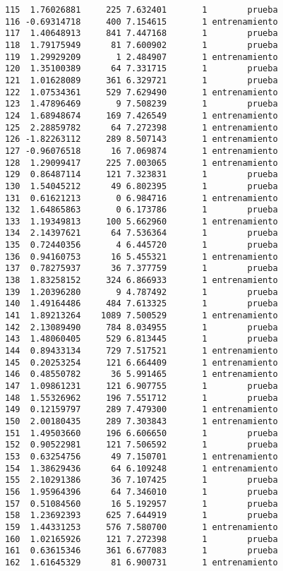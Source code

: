 \documentclass[
  letterpaper,
  DIV=11,
  numbers=noendperiod]{scrreprt}
\begin{document}
\begin{verbatim}
115  1.76026881     225 7.632401       1        prueba
116 -0.69314718     400 7.154615       1 entrenamiento
117  1.40648913     841 7.447168       1        prueba
118  1.79175949      81 7.600902       1        prueba
119  1.29929209       1 2.484907       1 entrenamiento
120  1.35100389      64 7.331715       1        prueba
121  1.01628089     361 6.329721       1        prueba
122  1.07534361     529 7.629490       1 entrenamiento
123  1.47896469       9 7.508239       1        prueba
124  1.68948674     169 7.426549       1 entrenamiento
125  2.28859782      64 7.272398       1 entrenamiento
126 -1.82263112     289 8.507143       1 entrenamiento
127 -0.96076518      16 7.069874       1 entrenamiento
128  1.29099417     225 7.003065       1 entrenamiento
129  0.86487114     121 7.323831       1        prueba
130  1.54045212      49 6.802395       1        prueba
131  0.61621213       0 6.984716       1 entrenamiento
132  1.64865863       0 6.173786       1        prueba
133  1.19349813     100 5.662960       1 entrenamiento
134  2.14397621      64 7.536364       1        prueba
135  0.72440356       4 6.445720       1        prueba
136  0.94160753      16 5.455321       1 entrenamiento
137  0.78275937      36 7.377759       1        prueba
138  1.83258152     324 6.866933       1 entrenamiento
139  1.20396280       9 4.787492       1        prueba
140  1.49164486     484 7.613325       1        prueba
141  1.89213264    1089 7.500529       1 entrenamiento
142  2.13089490     784 8.034955       1        prueba
143  1.48060405     529 6.813445       1        prueba
144  0.89433134     729 7.517521       1 entrenamiento
145  0.20253254     121 6.664409       1 entrenamiento
146  0.48550782      36 5.991465       1 entrenamiento
147  1.09861231     121 6.907755       1        prueba
148  1.55326962     196 7.551712       1        prueba
149  0.12159797     289 7.479300       1 entrenamiento
150  2.00180435     289 7.303843       1 entrenamiento
151  1.49503660     196 6.606650       1        prueba
152  0.90522981     121 7.506592       1        prueba
153  0.63254756      49 7.150701       1 entrenamiento
154  1.38629436      64 6.109248       1 entrenamiento
155  2.10291386      36 7.107425       1        prueba
156  1.95964396      64 7.346010       1        prueba
157  0.51084560      16 5.192957       1        prueba
158  1.23692393     625 7.644919       1        prueba
159  1.44331253     576 7.580700       1 entrenamiento
160  1.02165926     121 7.272398       1        prueba
161  0.63615346     361 6.677083       1        prueba
162  1.61645329      81 6.900731       1 entrenamiento

\end{verbatim}
\end{document}
